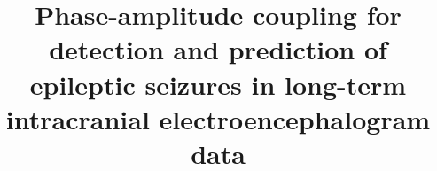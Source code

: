 \title{
Phase-amplitude coupling for detection and prediction of epileptic seizures in long-term intracranial electroencephalogram data
}
